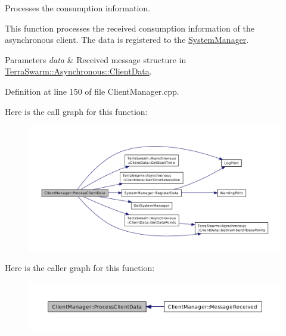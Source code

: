 Processes the consumption information. 

This function processes the received consumption information of the asynchronous client. The data is registered to the \hyperlink{class_system_manager}{System\-Manager}.


\begin{DoxyParams}{Parameters}
{\em data} & Received message structure in \hyperlink{class_terra_swarm_1_1_asynchronous_1_1_client_data}{Terra\-Swarm\-::\-Asynchronous\-::\-Client\-Data}. \\
\hline
\end{DoxyParams}


Definition at line 150 of file Client\-Manager.\-cpp.



Here is the call graph for this function\-:\nopagebreak
\begin{figure}[H]
\begin{center}
\leavevmode
\includegraphics[width=350pt]{class_client_manager_a1dd815fe845945ae8966b3a3f449ba0e_cgraph}
\end{center}
\end{figure}




Here is the caller graph for this function\-:\nopagebreak
\begin{figure}[H]
\begin{center}
\leavevmode
\includegraphics[width=350pt]{class_client_manager_a1dd815fe845945ae8966b3a3f449ba0e_icgraph}
\end{center}
\end{figure}


